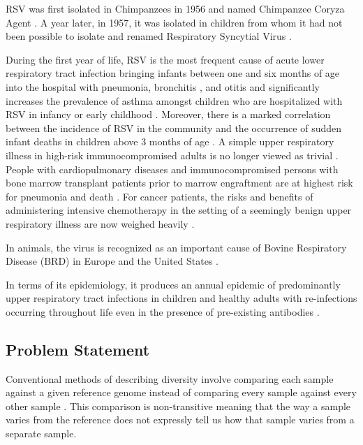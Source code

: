 \documentclass[10pt, a4paper]{article}
\begin{document}
RSV was first isolated in Chimpanzees in 1956 and named Chimpanzee Coryza Agent
\cite{morrisRecoveryCytopathogenicAgent1956}. 
A year later, in 1957, it was isolated in children from
whom it had not been possible to isolate and renamed Respiratory Syncytial
Virus \cite{beemAssociationChimpanzeeCoryza1960,chanockRecoveryInfantsRespiratory1957,zlatevaGeneticVariabilityMolecular2005}.

During the first year of life, RSV is the most frequent cause of acute lower
respiratory tract infection bringing infants between one and six months of age
into the hospital with pneumonia, bronchitis
\cite{stottRespiratorySyncytialVirus1985,zlatevaMolecularEvolutionCirculation2004,borchersRespiratorySyncytialVirus2013}, 
and otitis \cite{kleinRoleRespiratorySyncytial1982} and significantly increases the prevalence of
asthma amongst children who are hospitalized with RSV in infancy or early
childhood \cite{borchersRespiratorySyncytialVirus2013}. Moreover, there is a marked correlation
between the incidence of RSV in the community and the occurrence of sudden
infant deaths in children above 3 months of age \cite{chanockRecoveryInfantsRespiratory1957}.
A simple upper respiratory illness in high-risk immunocompromised adults is no
longer viewed as trivial \cite{whimbeyRespiratorySyncytialVirus2000}. 
People with cardiopulmonary diseases and immunocompromised persons with bone
marrow transplant patients prior to marrow engraftment are at highest risk for
pneumonia and death \cite{morrisRecoveryCytopathogenicAgent1956}.
For cancer patients, the risks and benefits of
administering intensive chemotherapy in the setting of a seemingly benign upper
respiratory illness are now weighed heavily \cite{kleinRoleRespiratorySyncytial1982}.

In animals, the virus is recognized as an important cause of Bovine Respiratory
Disease (BRD) in Europe and the United States \cite{whimbeyRespiratorySyncytialVirus2000}.

In terms of its epidemiology, it produces an annual epidemic of predominantly 
upper respiratory tract infections in children and healthy adults
\cite{chanockRecoveryInfantsRespiratory1957} with re-infections occurring throughout
life even in the presence of pre-existing antibodies \cite{sullenderGeneticDiversityAttachment1991}.
\subsection{Problem Statement}
\label{sec:org6ded3bb}
Conventional methods of describing diversity involve comparing each sample
against a given reference genome instead of comparing every sample against every
other sample \cite{patenGenomeGraphsEvolution2017}. This comparison is
non-transitive meaning that the way a sample varies from the reference does not
expressly tell us how that sample varies from a separate sample. 
\end{document}
